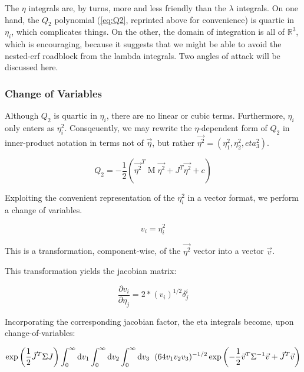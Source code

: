 \documentclass[10pt,letterpaper]{article}
\def\d{{\rm d}}  %
\begin{document}
The $\eta$ integrals are, by turns, more and less friendly than the $\lambda$ integrals. On one hand, the $Q_2$ polynomial (\ref{eq:Q2}, reprinted above for convenience) is quartic in $\eta_i$, which complicates things. On the other, the domain of integration is all of $\mathbb{R}^3$, which is encouraging, because it suggests that we might be able to avoid the nested-erf roadblock from the lambda integrals. Two angles of attack will be discussed here.

\subsubsection{Change of Variables}

Although $Q_2$ is quartic in $\eta_i$, there are no linear or cubic terms. Furthermore, $\eta_i$ only enters as $\eta_i^2$. Consqeuently, we may rewrite the $\eta$-dependent form of $Q_2$ in inner-product notation in terms not of $\vec{\eta}$, but rather $\vec{\eta^2} = (\eta_1^2,\eta_2^2,eta_3^2)$.

\begin{equation} \label{eq:eta_squared}
Q_2 = -\frac{1}{2} \left(\vec{\eta^2}^T \operatorname{M} \vec{\eta^2} + J^T \vec{\eta^2} + c \right)
\end{equation}

Exploiting the convenient representation of the $\eta_i^2$ in a vector format, we perform a change of variables.

$$v_i = \eta_i^2$$

This is a transformation, component-wise, of the $\vec{\eta^2}$ vector into a vector $\vec{v}$.

This transformation yields the jacobian matrix:

\begin{equation}
\frac{\partial v_i}{\partial \eta_j} = 2*(v_i)^{1/2} \delta^{i}_{j}
\end{equation}

Incorporating the corresponding jacobian factor, the eta integrals become, upon change-of-variables:

\begin{equation} \label{eq:eta_lintrick}
\exp\left(\frac{1}{2}\vec{J}^T \Sigma J\right) \int_0^{\infty} \d v_1 \int_0^{\infty} \d v_2 \int_0^{\infty} \d v_3 \hspace{0.5pc}  (64 v_1 v_2 v_3)^{-1/2} \exp\left(-\frac{1}{2} \vec{v}^T \Sigma^{-1} \vec{v} + \vec{J}^T \vec{v}\right)
\end{equation}
\end{document}
